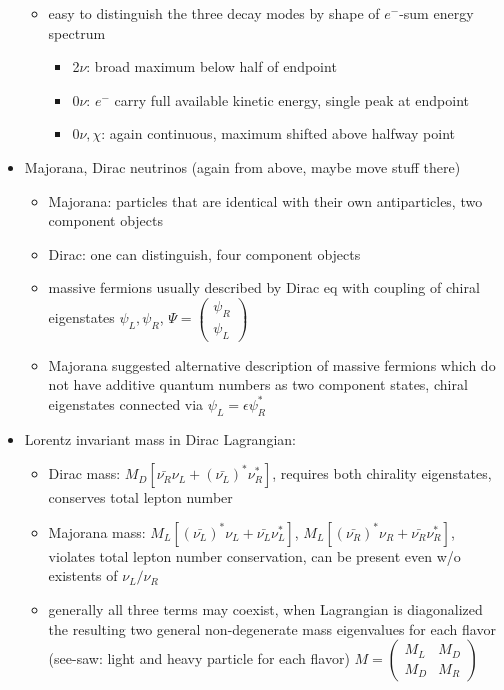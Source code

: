 \documentclass[encoding=utf8,british]{tumphthesis}
\begin{document}
\begin{itemize}
\begin{itemize}
\begin{itemize}
\end{itemize}
\item easy to distinguish the three decay modes by shape of \(e^-\)-sum energy spectrum
\begin{itemize}
\item 2\(\nu\): broad maximum below half of endpoint
\item 0\(\nu\): \(e^-\) carry full available kinetic energy, single peak at endpoint
\item 0\(\nu,\chi\): again continuous, maximum shifted above halfway point
\end{itemize}
\end{itemize}
\item Majorana, Dirac neutrinos (again from above, maybe move stuff there)
\begin{itemize}
\item Majorana: particles that are identical with their own antiparticles, two component objects
\item Dirac: one can distinguish, four component objects
\item massive fermions usually described by Dirac eq with coupling of chiral eigenstates \(\psi_L,\psi_R\), \(\Psi = \begin{pmatrix} \psi_R \\ \psi_L\end{pmatrix}\)
\item Majorana suggested alternative description of massive fermions which do not have additive quantum numbers as two component states, chiral eigenstates connected via \(\psi_L = \epsilon \psi_R^*\)
\end{itemize}
\item Lorentz invariant mass in Dirac Lagrangian:
\begin{itemize}
\item Dirac mass: \(M_D [\bar{\nu_R}\nu_L + (\bar{\nu_L})^*\nu_R^*]\), requires both chirality eigenstates, conserves total lepton number
\item Majorana mass: \(M_L [(\bar{\nu_L})^*\nu_L + \bar{\nu_L}\nu_L^*]\), \(M_L [(\bar{\nu_R})^*\nu_R + \bar{\nu_R}\nu_R^*]\), violates total lepton number conservation, can be present even w/o existents of \(\nu_L/\nu_R\)
\item generally all three terms may coexist, when Lagrangian is diagonalized the resulting two general non-degenerate mass eigenvalues for each flavor (see-saw: light and heavy particle for each flavor) \(M = \begin{pmatrix} M_L & M_D \\ M_D & M_R\end{pmatrix}\) 

\end{itemize}
\end{itemize}
\end{document}
